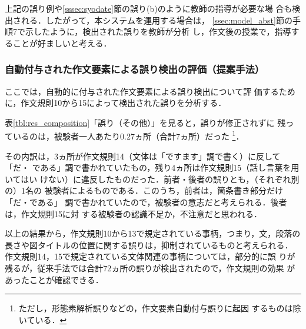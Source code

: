 \documentclass[japanese]{jnlp_1.4}
\def\mod{}
\begin{document}
上記の誤り例や\ref{sssec:syodate}節の誤り(b)のように教師の指導が必要な場
合も検出される．したがって，本システムを運用する場合は，
\ref{ssec:model_abst}節の手順7で示したように，検出された誤りを教師が分析
し，作文後の授業で，指導することが好ましいと考える．


\subsubsection{自動付与された作文要素による誤り検出の評価（提案手法）}
\label{sssec:jido}

ここでは，自動的に付与された作文要素による誤り検出について評
価するために，作文規則10から15によって検出された誤りを分析する．

表\ref{tbl:res_composition}「誤り（その他）」を見ると，誤りが修正されずに
残っているのは，被験者一人あたり0.27ヵ所（合計7ヵ所）だった
\footnote{{\mod ただし，形態素解析誤りなどの，作文要素自動付与誤りに起因
するものは除いている．}}．

その内訳は，3ヵ所が作文規則14（文体は「ですます」調で書く）に反して「だ・
である」調で書かれていたもの，残り4ヵ所は作文規則15（話し言葉を用いてはい
けない）に違反したものだった．前者・後者の誤りとも，（それぞれ別の）1名の
被験者によるものである．このうち，前者は，箇条書き部分だけ「だ・である」
調で書かれていたので，被験者の意志だと考えられる．後者は，作文規則15に対
する被験者の認識不足か，不注意だと思われる．

以上の結果から，作文規則10から13で規定されている事柄，つまり，文，段落の
長さや図タイトルの位置に関する誤りは，抑制されているものと考えられる．
{\mod 作文規則14，15で規定されている文体関連の事柄については，部分的に誤
りが残るが，従来手法では合計72ヵ所の誤りが検出されたので，作文規則の効果
があったことが確認できる．}
\end{document}
